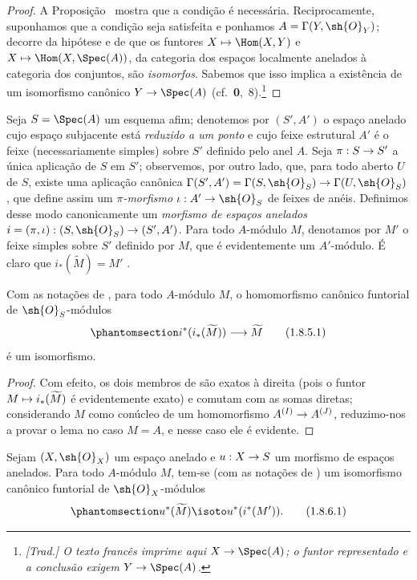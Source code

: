 \documentclass[oneside]{amsart}
\makeatletter
\newcommand{\ega@arrow}[2]{\mathchoice{#1}{#2}{#2}{#2}}
\let\ega@shortmapsto\mapsto
\renewcommand{\to}{\ega@arrow{\longrightarrow}{\rightarrow}}
\renewcommand{\mapsto}{\ega@arrow{\longmapsto}{\ega@shortmapsto}}
\newcommand{\oldpage}[2][]{{\marginnote{\normalfont\textbf{#1}~|~#2}}\ignorespaces}
\let\EGAOriginalLabel\label
\renewcommand{\label}[1]{\phantomsection\EGAOriginalLabel{#1}}
\makeatother
\begin{document}
\begin{proof}
A Proposição~ mostra que a condição é necessária.
Reciprocamente, suponhamos que a condição seja satisfeita e ponhamos
$A=\Gamma(Y,\sh{O}_Y)$;
decorre da hipótese e de  que os funtores
$X\mapsto\Hom(X,Y)$ e $X\mapsto\Hom(X,\Spec(A))$, da categoria dos
espaços localmente anelados à categoria dos conjuntos, são
\emph{isomorfos}.
Sabemos que isso implica a existência de um isomorfismo canônico
$Y\to\Spec(A)$ (cf.~\textbf{0},~8).\footnote{\emph{[Trad.] O texto
francês imprime aqui $X\to\Spec(A)$; o funtor representado e a conclusão
exigem $Y\to\Spec(A)$.}}
\end{proof}

\begin{env}[1.8.4]
\label{I.1.8.4}
Seja $S=\Spec(A)$ um esquema afim;
denotemos por $(S',A')$ o espaço anelado cujo espaço subjacente está
\emph{reduzido a um ponto} e cujo feixe estrutural $A'$ é o feixe
(necessariamente simples) sobre $S'$ definido pelo anel $A$.
Seja $\pi:S\to S'$ a única aplicação de $S$ em $S'$;
observemos, por outro lado, que, para todo aberto $U$ de $S$, existe uma
aplicação canônica
$\Gamma(S',A')=\Gamma(S,\sh{O}_S)\to\Gamma(U,\sh{O}_S)$, que define assim
um \emph{$\pi$-morfismo} $\iota:A'\to\sh{O}_S$ de feixes de anéis.
Definimos desse modo canonicamente um \emph{morfismo de espaços anelados
$i=(\pi,\iota):(S,\sh{O}_S)\to(S',A')$}.
Para todo $A$-módulo $M$, denotamos por $M'$ o feixe simples sobre $S'$
definido por $M$, que é evidentemente um $A'$-módulo.
É claro que $i_*(\widetilde{M})=M'$ .
\end{env}

\begin{lemma}[1.8.5]
\label{I.1.8.5}
Com as notações de , para todo $A$-módulo $M$, o
homomorfismo canônico funtorial de $\sh{O}_S$-módulos
\[
  \label{I.1.8.5.1}
  i^*(i_*(\widetilde{M}))\to\widetilde{M}
  \tag{1.8.5.1}
\]
é um isomorfismo.
\end{lemma}

\begin{proof}
Com efeito, os dois membros de  são exatos à direita
(pois o funtor $M\mapsto i_*(\widetilde{M})$ é evidentemente exato) e
comutam com as somas diretas;
considerando $M$ como conúcleo de um homomorfismo
$A^{(I)}\to A^{(J)}$, reduzimo-nos a provar o lema no caso $M=A$, e
nesse caso ele é evidente.
\end{proof}

\begin{corollary}[1.8.6]
\label{I.1.8.6}
Sejam $(X,\sh{O}_X)$ um espaço anelado e $u:X\to S$ um morfismo de
espaços anelados.
\oldpage[II]{220}
Para todo $A$-módulo $M$, tem-se (com as notações de
) um isomorfismo canônico funtorial de
$\sh{O}_X$-módulos
\[
  \label{I.1.8.6.1}
  u^*(\widetilde{M})\isoto u^*(i^*(M')).
  \tag{1.8.6.1}
\]
\end{corollary}
\end{document}
